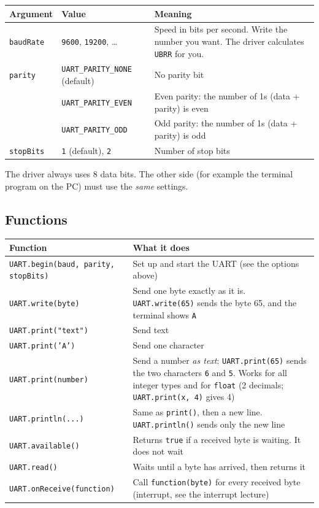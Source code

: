 \documentclass[11pt,a4paper]{article}
\newcommand{\code}[1]{\texttt{#1}}
\begin{document}
\begin{center}
\small
\begin{tabularx}{\textwidth}{@{}l l X@{}}
\toprule
\textbf{Argument} & \textbf{Value} & \textbf{Meaning} \\
\midrule
\code{baudRate} & \code{9600}, \code{19200}, \dots & Speed in bits per second. Write the number you want.
      The driver calculates \code{UBRR} for you. \\
\midrule
\code{parity}   & \code{UART\_PARITY\_NONE} (default) & No parity bit \\
                & \code{UART\_PARITY\_EVEN}           & Even parity: the number of 1s (data + parity) is even \\
                & \code{UART\_PARITY\_ODD}            & Odd parity: the number of 1s (data + parity) is odd \\
\midrule
\code{stopBits} & \code{1} (default), \code{2} & Number of stop bits \\
\bottomrule
\end{tabularx}
\end{center}

The driver always uses 8 data bits. The other side (for example the terminal
program on the PC) must use the \emph{same} settings.

\subsection*{Functions}

\begin{center}
\small
\begin{tabularx}{\textwidth}{@{}l X@{}}
\toprule
\textbf{Function} & \textbf{What it does} \\
\midrule
\code{UART.begin(baud, parity, stopBits)} & Set up and start the UART (see the options above) \\
\midrule
\code{UART.write(byte)} & Send one byte exactly as it is. \code{UART.write(65)} sends the byte 65, and the terminal shows \code{A} \\
\code{UART.print("text")} & Send text \\
\code{UART.print('A')} & Send one character \\
\code{UART.print(number)} & Send a number \emph{as text}: \code{UART.print(65)} sends the two characters \code{6} and \code{5}.
       Works for all integer types and for \code{float} (2 decimals; \code{UART.print(x, 4)} gives 4) \\
\code{UART.println(...)} & Same as \code{print()}, then a new line. \code{UART.println()} sends only the new line \\
\midrule
\code{UART.available()} & Returns \code{true} if a received byte is waiting. It does not wait \\
\code{UART.read()} & Waits until a byte has arrived, then returns it \\
\midrule
\code{UART.onReceive(function)} & Call \code{function(byte)} for every received byte (interrupt, see the interrupt lecture) \\
\bottomrule
\end{tabularx}
\end{center}
\end{document}
